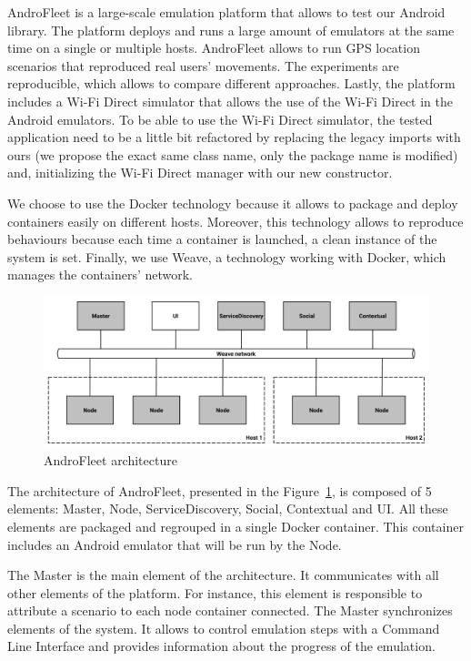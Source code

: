 AndroFleet is a large-scale emulation platform that allows to test our Android library.
The platform deploys and runs a large amount of emulators at the same time on a single or multiple hosts.
AndroFleet allows to run GPS location scenarios that reproduced real users' movements.
The experiments are reproducible, which allows to compare different approaches.
Lastly, the platform includes a Wi-Fi Direct simulator that allows the use of the Wi-Fi Direct in the Android emulators.
To be able to use the Wi-Fi Direct simulator, the tested application need to be a little bit refactored by replacing the legacy imports with ours (we propose the exact same class name, only the package name is modified) and, initializing the Wi-Fi Direct manager with our new constructor.

We choose to use the Docker technology because it allows to package and deploy containers easily on different hosts.
Moreover, this technology allows to reproduce behaviours because each time a container is launched, a clean instance of the system is set.
Finally, we use Weave, a technology working with Docker, which manages the containers' network.

\begin{figure}[h]
    \centering
    \includegraphics[width=\textwidth]{figures/androfleet}
    \caption{\label{AndroFleet} AndroFleet architecture}
\end{figure}

The architecture of AndroFleet, presented in the Figure~\ref{AndroFleet}, is composed of 5 elements: Master, Node, ServiceDiscovery, Social, Contextual and UI.
All these elements are packaged and regrouped in a single Docker container.
This container includes an Android emulator that will be run by the Node.

The Master is the main element of the architecture.
It communicates with all other elements of the platform.
For instance, this element is responsible to attribute a scenario to each node container connected.
The Master synchronizes elements of the system.
It allows to control emulation steps with a Command Line Interface and provides information about the progress of the emulation.

